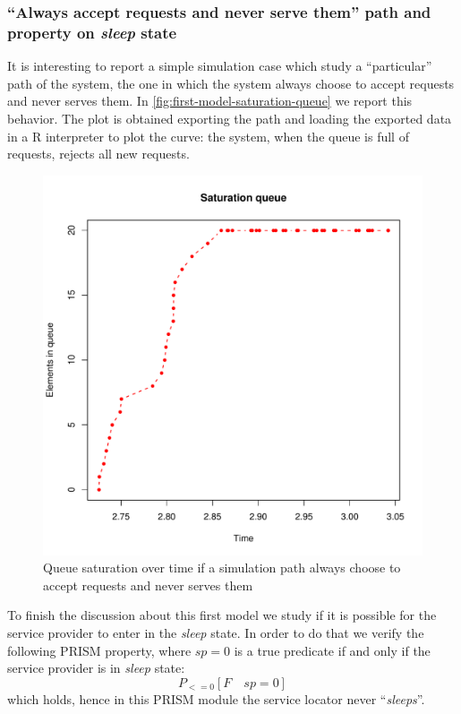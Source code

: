 \subsubsection{``Always accept requests and never serve them'' path
  and property on \emph{sleep} state}

It is interesting to report a simple simulation case which study a
``particular'' path of the system, the one in which the system always
choose to accept requests and never serves them. In
\autoref{fig:first-model-saturation-queue} we report this
behavior. The plot is obtained exporting the path and loading the
exported data in a R interpreter to plot the curve: the system, when
the queue is full of requests, rejects all new requests.
\begin{figure}[htb]
  \centering
  \includegraphics[width=13cm]{quantitative-project/r-project/saturation-queue.pdf}
  \caption{Queue saturation over time if a simulation path always
    choose to accept requests and never serves them}
  \label{fig:first-model-saturation-queue}
\end{figure}

To finish the discussion about this first model we study if it is
possible for the service provider to enter in the \emph{sleep}
state. In order to do that we verify the following PRISM property,
where $sp=0$ is a true predicate if and only if the service provider
is in \emph{sleep} state:
\begin{displaymath}
  P_{<=0} [ F\quad sp=0 ]
\end{displaymath}
which holds, hence in this PRISM module the service locator never
``\emph{sleeps}''.

